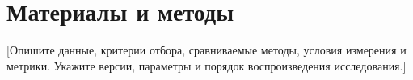 \section{Материалы и методы}

[Опишите данные, критерии отбора, сравниваемые методы, условия измерения и
метрики. Укажите версии, параметры и порядок воспроизведения исследования.]
